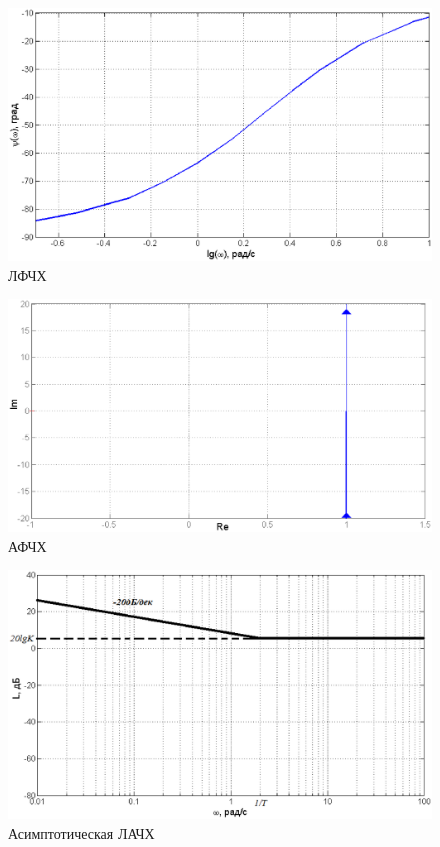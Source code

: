 \documentclass[12pt,a4paper]{article}
\begin{document}
\begin{figure}[H]
	\centering
	\includegraphics[width=1\linewidth]{LFCHH3.eps}
	\caption{ЛФЧХ}
\end{figure}
\begin{figure}[H]
	\centering
	\includegraphics[width=1\linewidth]{AFCHH3.eps}
	\caption{АФЧХ}
\end{figure}
\begin{figure}[H]
	\centering
	\includegraphics[width=1\linewidth]{L3.eps}
	\caption{Асимптотическая ЛАЧХ}
\end{figure}
\end{document}
